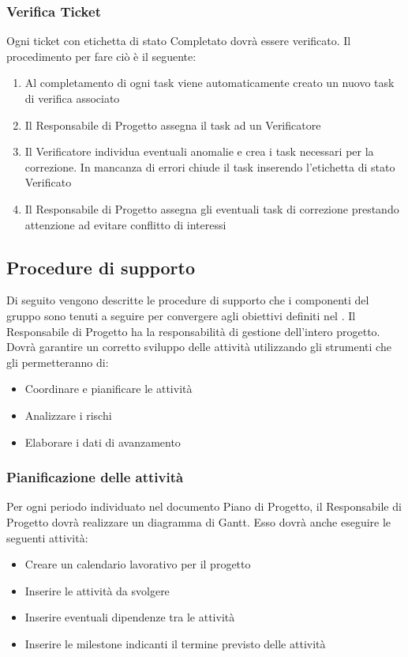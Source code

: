 \subsubsection{Verifica Ticket}

Ogni ticket con etichetta di stato Completato dovrà essere verificato. Il procedimento per fare ciò è il seguente:

\begin{enumerate}
	\item  Al completamento di ogni task viene automaticamente creato un nuovo task di verifica associato
	\item Il Responsabile di Progetto assegna il task ad un Verificatore
	\item Il Verificatore individua eventuali anomalie e crea i task necessari per la correzione. In mancanza di errori chiude il task inserendo l’etichetta di stato Verificato
	\item Il Responsabile di Progetto assegna gli eventuali task di correzione prestando attenzione ad evitare conflitto di interessi
\end{enumerate}

\subsection{Procedure di supporto}
Di seguito vengono descritte le procedure di supporto che i componenti del gruppo sono tenuti a seguire per convergere agli obiettivi definiti nel \pianodiqualifica. Il Responsabile di Progetto ha la responsabilità di gestione dell’intero progetto.
Dovrà garantire un corretto sviluppo delle attività utilizzando gli strumenti che gli permetteranno di:
\begin{itemize}
	\item Coordinare e pianificare le attività
	\item Analizzare i rischi
	\item Elaborare i dati di avanzamento
\end{itemize}

\subsubsection{Pianificazione delle attività}

Per ogni periodo individuato nel documento Piano di Progetto, il Responsabile di Progetto dovrà realizzare un diagramma di Gantt. Esso dovrà anche eseguire le seguenti attività:

\begin{itemize}
	\item Creare un calendario lavorativo per il progetto
	\item Inserire le attività da svolgere
	\item Inserire eventuali dipendenze tra le attività
	\item Inserire le milestone indicanti il termine previsto delle attività
\end{itemize}

